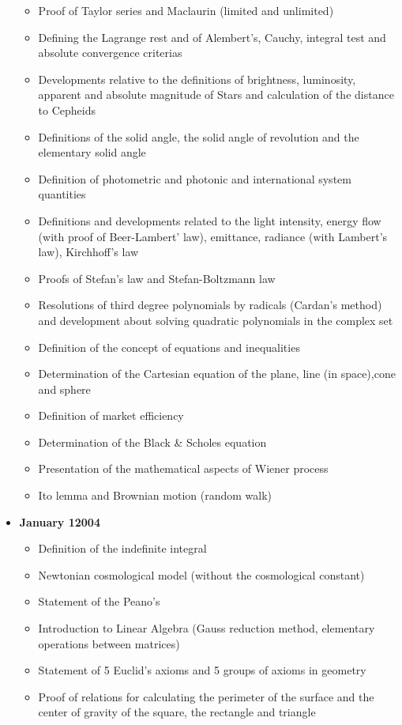 \begin{itemize}
\begin{itemize}[noitemsep]
			\item Proof of Taylor series and Maclaurin (limited and unlimited)
			\item Defining the Lagrange rest and of Alembert's, Cauchy, integral test and absolute convergence criterias
			\item Developments relative to the definitions of brightness, luminosity, apparent and absolute magnitude of Stars and calculation of the distance to Cepheids
			\item Definitions of the solid angle, the solid angle of revolution and the elementary solid angle
			\item Definition of photometric and photonic and international system quantities
			\item Definitions and developments related to the light intensity, energy flow (with proof of Beer-Lambert' law), emittance, radiance (with Lambert's law), Kirchhoff's law
			\item Proofs of Stefan's law and Stefan-Boltzmann law
			\item Resolutions of third degree polynomials by radicals (Cardan's method) and development about solving quadratic polynomials in the complex set
			\item Definition of the concept of equations and inequalities
			\item Determination of the Cartesian equation of the plane, line (in space),cone and sphere
			\item Definition of market efficiency
			\item Determination of the Black \& Scholes equation 
			\item Presentation of the mathematical aspects of Wiener process
			\item Ito lemma and Brownian motion (random walk)
		\end{itemize}
	\item \textbf{January 12004}
		\begin{itemize}[noitemsep]
			\item Definition of the indefinite integral
			\item Newtonian cosmological model (without the cosmological constant)
			\item Statement of the Peano's
			\item Introduction to Linear Algebra (Gauss reduction method, elementary operations between matrices)
			\item Statement of 5 Euclid's axioms and 5 groups of axioms in geometry
			\item Proof of relations for calculating the perimeter of the surface and the center of gravity of the square, the rectangle and triangle

\end{itemize}
\end{itemize}
